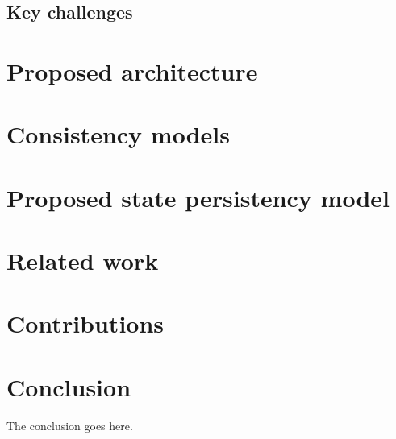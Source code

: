 \documentclass[journal,oneside,a4paper,onecolumn]{IEEEtran}
\begin{document}
\subsection{Key challenges}



\section{Proposed architecture}

\section{Consistency models}
\label{consistency_models}

\section{Proposed state persistency model}

\section{Related work}

\section{Contributions}

\section{Conclusion}
The conclusion goes here.




\end{document}
